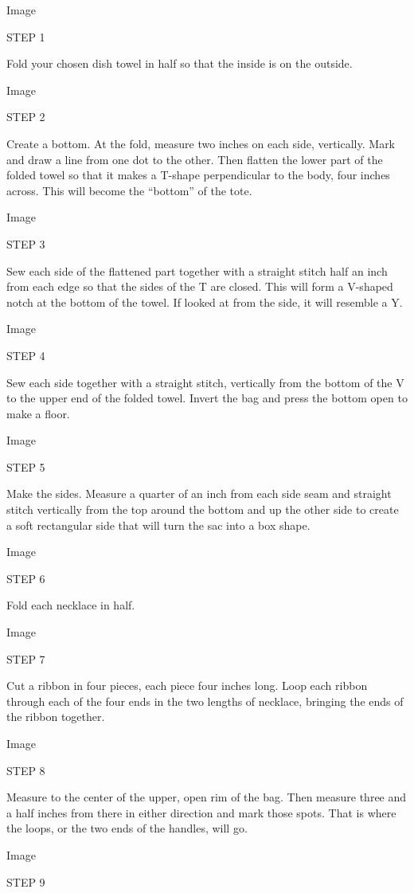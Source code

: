 Image

STEP 1

Fold your chosen dish towel in half so that the inside is on the
outside.

Image

STEP 2

Create a bottom. At the fold, measure two inches on each side,
vertically. Mark and draw a line from one dot to the other. Then flatten
the lower part of the folded towel so that it makes a T-shape
perpendicular to the body, four inches across. This will become the
``bottom'' of the tote.

Image

STEP 3

Sew each side of the flattened part together with a straight stitch half
an inch from each edge so that the sides of the T are closed. This will
form a V-shaped notch at the bottom of the towel. If looked at from the
side, it will resemble a Y.

Image

STEP 4

Sew each side together with a straight stitch, vertically from the
bottom of the V to the upper end of the folded towel. Invert the bag and
press the bottom open to make a floor.

Image

STEP 5

Make the sides. Measure a quarter of an inch from each side seam and
straight stitch vertically from the top around the bottom and up the
other side to create a soft rectangular side that will turn the sac into
a box shape.

Image

STEP 6

Fold each necklace in half.

Image

STEP 7

Cut a ribbon in four pieces, each piece four inches long. Loop each
ribbon through each of the four ends in the two lengths of necklace,
bringing the ends of the ribbon together.

Image

STEP 8

Measure to the center of the upper, open rim of the bag. Then measure
three and a half inches from there in either direction and mark those
spots. That is where the loops, or the two ends of the handles, will go.

Image

STEP 9

